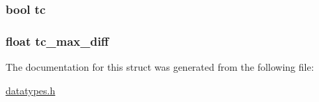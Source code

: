 \subsubsection[{tc}]{\setlength{\rightskip}{0pt plus 5cm}bool tc}\label{structppm__config_adb12b652190d775d7d98e95fcde39856}
\hypertarget{structppm__config_a08878e275186fe365e2e23cc038fed07}{}
\subsubsection[{tc\+\_\+max\+\_\+diff}]{\setlength{\rightskip}{0pt plus 5cm}float tc\+\_\+max\+\_\+diff}\label{structppm__config_a08878e275186fe365e2e23cc038fed07}


The documentation for this struct was generated from the following file\+:\begin{DoxyCompactItemize}
\item 
\hyperlink{datatypes_8h}{datatypes.\+h}\end{DoxyCompactItemize}
